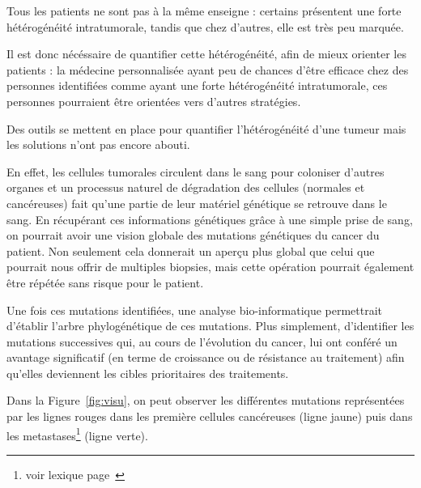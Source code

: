 \documentclass[12pt, openany]{report}
\begin{document}
Tous les patients ne sont pas à la même enseigne : certains présentent une forte hétérogénéité intratumorale, tandis que chez d'autres, elle est très peu marquée. 

Il est donc nécéssaire de quantifier cette hétérogénéité, afin de mieux orienter les patients : la médecine personnalisée ayant peu de chances d'être efficace chez des personnes identifiées comme ayant une forte hétérogénéité intratumorale, ces personnes pourraient être orientées vers d'autres stratégies. 

Des outils se mettent en place pour quantifier l'hétérogénéité d'une tumeur mais les solutions n’ont pas encore abouti. 

En effet, les cellules tumorales circulent dans le sang pour coloniser d’autres organes et un processus naturel de dégradation des cellules (normales et cancéreuses) fait qu’une partie de leur matériel génétique se retrouve dans le sang. En récupérant ces informations génétiques grâce à une simple prise de sang, on pourrait avoir une vision globale des mutations génétiques du cancer du patient. Non seulement cela donnerait un aperçu plus global que celui que pourrait nous offrir de multiples biopsies, mais cette opération pourrait également être répétée sans risque pour le patient. 

Une fois ces mutations identifiées, une analyse bio-informatique permettrait d’établir l’arbre phylogénétique de ces mutations. Plus simplement, d’identifier les mutations successives qui, au cours de l’évolution du cancer, lui ont conféré un avantage significatif (en terme de croissance ou de résistance au traitement) afin qu’elles deviennent les cibles prioritaires des traitements. 

Dans la Figure~\ref{fig:visu}, on peut observer les différentes mutations représentées par les lignes rouges dans les première cellules cancéreuses (ligne jaune) puis dans les metastases\footnote{voir lexique page~\pageref{lexique}} (ligne verte).
\end{document}
